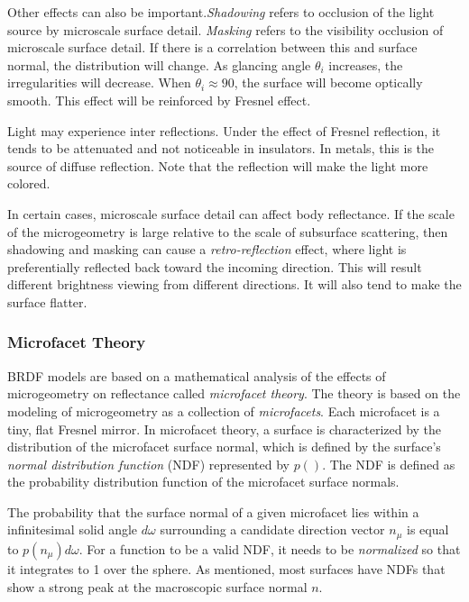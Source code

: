 \documentclass[10pt, a4paper]{article}
\begin{document}
            Other effects can also be important.\emph{Shadowing} refers to occlusion of the light source by microscale surface detail. \emph{Masking} refers to the visibility occlusion of microscale surface detail. If there is a correlation between this and surface normal, the distribution will change. As glancing angle $\theta_i$ increases, the irregularities will decrease. When $\theta_i \approx 90$, the surface will become optically smooth. This effect will be reinforced by Fresnel effect. 

            Light may experience inter reflections. Under the effect of Fresnel reflection, it tends to be attenuated and not noticeable in insulators. In metals, this is the source of diffuse reflection. Note that the reflection will make the light more colored. 

            In certain cases, microscale surface detail can affect body reflectance. If the scale of the microgeometry is large relative to the scale of subsurface scattering, then shadowing and masking can cause a \emph{retro-reflection} effect, where light is preferentially reflected back toward the incoming direction. This will result different brightness viewing from different directions. It will also tend to make the surface flatter. 

        \subsubsection{Microfacet Theory}
            BRDF models are based on a mathematical analysis of the effects of microgeometry on reflectance called \emph{microfacet theory}. The theory  is based on the modeling of microgeometry as a collection of \emph{microfacets}. Each microfacet is a tiny, flat Fresnel mirror. In microfacet theory, a surface is characterized by the distribution of the microfacet surface normal, which is defined by the surface's \emph{normal distribution function} (NDF) represented by $p()$. The NDF is defined as the probability distribution function of the microfacet surface normals. 
            
            The probability that the surface normal of a given microfacet lies within a infinitesimal solid angle $d\omega$ surrounding a candidate direction vector $n_{\mu}$ is equal to $p(n_{\mu})d\omega$. For a function to be a valid NDF, it needs to be \emph{normalized} so that it integrates to 1 over the sphere. As mentioned, most surfaces have NDFs that show a strong peak at the macroscopic surface normal $n$.
\end{document}
